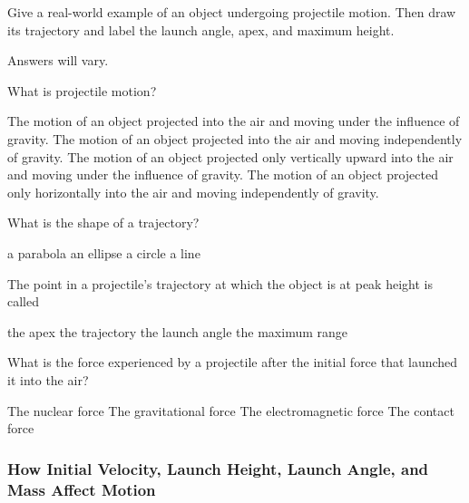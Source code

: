 \documentclass[../main-physics-problems.tex]{subfiles}
\begin{document}
\begin{questions}
\question
Give a real-world example of an object undergoing projectile motion. Then draw its trajectory and label the launch angle, apex, and maximum height.

\begin{solutionorbox}[5cm]
    Answers will vary.
\end{solutionorbox}

\question
What is projectile motion?
    
\begin{randomizechoices}
    \correctchoice The motion of an object projected into the air and moving under the influence of gravity.
    \choice The motion of an object projected into the air and moving independently of gravity.
    \choice The motion of an object projected only vertically upward into the air and moving under the influence of gravity.
    \choice The motion of an object projected only horizontally into the air and moving independently of gravity.
\end{randomizechoices}

\question
What is the shape of a trajectory?

\begin{randomizechoices}
    \correctchoice a parabola
    \choice an ellipse
    \choice a circle
    \choice a line
\end{randomizechoices}

\question
The point in a projectile's trajectory at which the object is at peak height is called

\begin{randomizechoices}
    \correctchoice the apex
    \choice the trajectory
    \choice the launch angle
    \choice the maximum range
\end{randomizechoices}

\question
What is the force experienced by a projectile after the initial force that launched it into the air?

\begin{randomizechoices}
    \choice The nuclear force
    \correctchoice The gravitational force
    \choice The electromagnetic force
    \choice The contact force
\end{randomizechoices}
\end{questions}


\subsubsection{How Initial Velocity, Launch Height, Launch Angle, and Mass Affect Motion}
\end{document}
